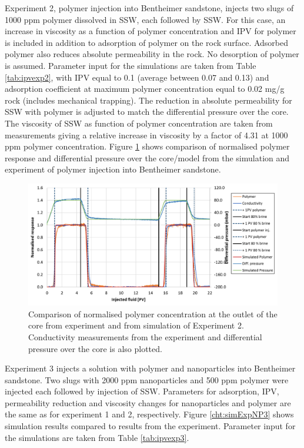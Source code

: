 Experiment 2, polymer injection into Bentheimer sandstone, injects two slugs of 1000 ppm polymer dissolved in SSW, each followed by SSW. For this case, an increase in viscosity as a function of polymer concentration and IPV for polymer is included in addition to adsorption of polymer on the rock surface. Adsorbed polymer also reduces absolute permeability in the rock. No desorption of polymer is assumed. Parameter input for the simulations are taken from Table \ref{tab:ipvexp2}, with IPV equal to 0.1 (average between 0.07 and 0.13) and adsorption coefficient at maximum polymer concentration equal to 0.02 mg/g rock (includes mechanical trapping). The reduction in absolute permeability for SSW with polymer is adjusted to match the differential pressure over the core. The viscosity of SSW as function of polymer concentration are taken from measurements giving a relative increase in viscosity by a factor of 4.31 at 1000 ppm polymer concentration. Figure \ref{cht:simExpNP2} shows comparison of normalised polymer response and differential pressure over the core/model from the simulation and experiment of polymer injection into Bentheimer sandstone.

\begin{figure}[h]
    \centering
    \includegraphics[width=\textwidth]{img/cht/simExpNP2.png}
    \caption{Comparison of normalised polymer concentration at the outlet of the core from experiment and from simulation of Experiment 2. Conductivity measurements from the experiment and differential pressure over the core is also plotted.}
    \label{cht:simExpNP2}
\end{figure}

Experiment 3 injects a solution with polymer and nanoparticles into Bentheimer sandstone. Two slugs with 2000 ppm nanoparticles and 500 ppm polymer were injected each followed by injection of SSW. Parameters for adsorption, IPV, permeability reduction and viscosity changes for nanoparticles and polymer are the same as for experiment 1 and 2, respectively. Figure \ref{cht:simExpNP3} shows simulation results compared to results from the experiment. Parameter input for the simulations are taken from Table \ref{tab:ipvexp3}.

